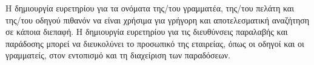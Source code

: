 Η δημιουργία ευρετηρίου για τα ονόματα της/του γραμματέα, της/του πελάτη και της/του οδηγού πιθανόν να είναι χρήσιμα για γρήγορη και αποτελεσματική αναζήτηση σε κάποια διεπαφή.
\hfill \break
Η δημιουργία ευρετηρίου για τις διευθύνσεις παραλαβής και παράδοσης μπορεί να διευκολύνει το προσωπικό της εταιρείας, όπως οι οδηγοί και οι γραμματείς, στον εντοπισμό και τη διαχείριση των παραδόσεων.
